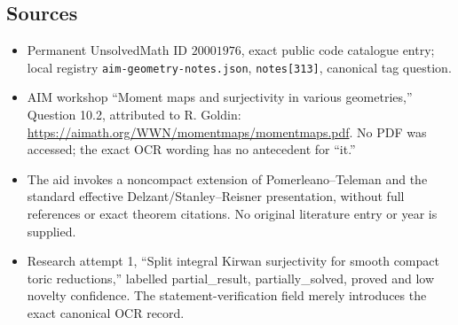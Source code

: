 \documentclass[11pt]{article}
\begin{document}
\subsection{Sources}
\begin{itemize}
\item Permanent UnsolvedMath ID \(20001976\), exact public code catalogue entry; local registry \texttt{aim-geometry-notes.json}, \texttt{notes[313]}, canonical tag question.
\item AIM workshop ``Moment maps and surjectivity in various geometries,'' Question 10.2, attributed to R. Goldin: \url{https://aimath.org/WWN/momentmaps/momentmaps.pdf}. No PDF was accessed; the exact OCR wording has no antecedent for ``it.''
\item The aid invokes a noncompact extension of Pomerleano--Teleman and the standard effective Delzant/Stanley--Reisner presentation, without full references or exact theorem citations. No original literature entry or year is supplied.
\item Research attempt 1, ``Split integral Kirwan surjectivity for smooth compact toric reductions,'' labelled partial\_result, partially\_solved, proved and low novelty confidence. The statement-verification field merely introduces the exact canonical OCR record.
\end{itemize}
\end{document}

